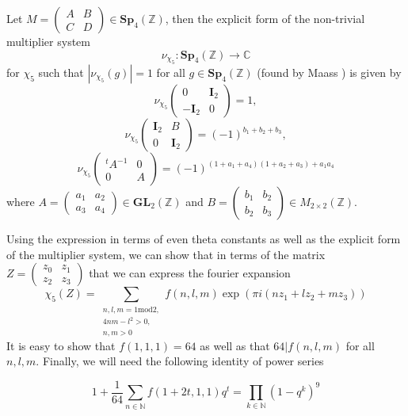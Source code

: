 \documentclass[9pt]{amsart} \usepackage[utf8]{inputenc}
\newcommand{\Z}{\mathbb{Z}} \newcommand{\C}{\mathbb{C}}
\newcommand{\Sp}{\mathbf{Sp}}
\newcommand{\GL}{\mathbf{GL}}
\newcommand{\Id}{\mathbf{I}}
\begin{document}
Let $M = \begin{pmatrix} A & B\\
C & D\end{pmatrix} \in \Sp_4(\Z)$, then the explicit form of the
non-trivial multiplier system $$\nu_{\chi_5}:
\Sp_4(\Z) \rightarrow \C$$ for $\chi_5$
such that $|\nu_{\chi_5}(g)| = 1$ for all $g \in \Sp_4(\Z)$
(found by Maass \cite{MAASS:1}) is given by
$$\nu_{\chi_5}\begin{pmatrix}0 & \Id_2\\
-\Id_2 & 0\end{pmatrix} = 1,$$ $$\nu_{\chi_5}\begin{pmatrix}\Id_2 & B\\
0 & \Id_2\end{pmatrix} = (-1)^{b_1 + b_2 + b_3},$$
$$\nu_{\chi_5}\begin{pmatrix}{}^tA^{-1} & 0\\
0 & A\end{pmatrix} = (-1)^{(1 + a_1 + a_4)(1 + a_2 + a_3) + a_1a_4}$$
where $A = \begin{pmatrix}a_1 & a_2\\
a_3 & a_4\end{pmatrix} \in \GL_2(\Z)$ and $B = \begin{pmatrix}b_1 &
b_2\\
b_2 & b_3\end{pmatrix} \in M_{2\times2}(\Z).$



Using the expression in terms of even theta constants as well as the
explicit form of the multiplier system, we can show that
in terms of the matrix $Z=\begin{pmatrix}z_0 & z_1\\ z_2 &
z_3\end{pmatrix}$ that we can express the fourier expansion $$\chi_5(Z) =
\displaystyle\sum_{\substack{n,l,m = 1 \textrm{mod} 2,\\4nm - l^2 > 0,\\ n,m > 0}} f(n,l,m)\exp(\pi
i(n z_1 + l z_2 + mz_3))$$ It is easy to show that $f(1,1,1) = 64$ as
well as that $64 | f(n,l,m)$ for all $n,l,m$.  Finally, we
will need the following identity of power series

$$1 + \frac{1}{64} \displaystyle\sum_{n\in \mathbb{N}} f(1+2t, 1, 1)q^t
= \displaystyle\prod_{k\in
\mathbb{N}}(1 - q^k)^9$$
\end{document}
